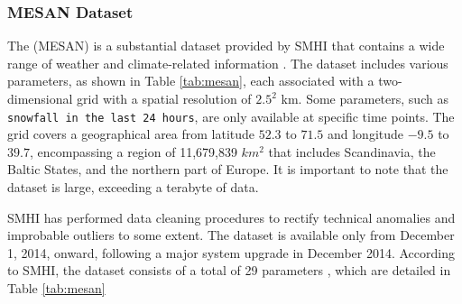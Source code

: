 \subsubsection{MESAN Dataset}
\label{sec:overview-mesan}

The (MESAN) is a substantial dataset provided by SMHI that contains a wide range of weather and climate-related information \cite{data-mesan}. The dataset includes various parameters, as shown in Table \ref{tab:mesan}, each associated with a two-dimensional grid with a spatial resolution of $2.5^2$ km. Some parameters, such as \texttt{snowfall in the last 24 hours}, are only available at specific time points. The grid covers a geographical area from latitude $52.3$ to $71.5$ and longitude $-9.5$ to $39.7$, encompassing a region of 11,679,839 $km^2$ that includes Scandinavia, the Baltic States, and the northern part of Europe. It is important to note that the dataset is large, exceeding a terabyte of data.

SMHI has performed data cleaning procedures to rectify technical anomalies and improbable outliers to some extent. The dataset is available only from December 1, 2014, onward, following a major system upgrade in December 2014. According to SMHI, the dataset consists of a total of 29 parameters \cite{smhi-grib}, which are detailed in Table \ref{tab:mesan}

